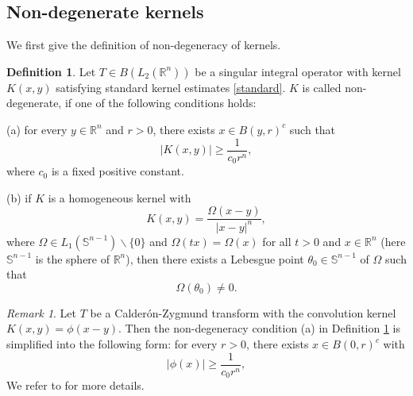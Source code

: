 \documentclass[oneside,english,a4wide]{amsart}
\numberwithin{equation}{section}
\numberwithin{figure}{section}
\theoremstyle{plain}
\theoremstyle{plain}
\theoremstyle{definition}
\theoremstyle{plain}
\theoremstyle{remark}
\theoremstyle{definition}
\newtheorem{definition}[thm]{Definition}
\theoremstyle{remark}
\newtheorem{remark}[thm]{Remark}
\theoremstyle{definition}
\newcommand{\8}{\infty}
\begin{document}
\subsection{Non-degenerate kernels}
We first give the definition of non-degeneracy of kernels.
\begin{definition}\label{nondege}
	Let $T\in B(L_2(\mathbb{R}^n))$ be a singular integral operator with kernel $K(x,y)$ satisfying standard kernel estimates \eqref{standard}. $K$ is called non-degenerate, if one of the following conditions holds:
	
	(a) for every $y\in \mathbb{R}^n$ and $r>0$, there exists $x\in B(y,r)^c$ such that
	\begin{equation}\label{nondege1}
		|K(x,y)|\ge \frac{1}{c_0r^n},
	\end{equation}
	where $c_0$ is a fixed positive constant.
	
	(b) if $K$ is a homogeneous kernel with
	\begin{equation}\label{nondege2}
		K(x,y)=\frac{\Omega(x-y)}{|x-y|^n},
	\end{equation}
	where $\Omega\in L_1(\mathbb{S}^{n-1})\backslash\{0\}$ and $\Omega(tx)=\Omega(x)$ for all $t>0$ and $x\in \mathbb{R}^n$ (here $\mathbb{S}^{n-1}$ is the sphere of $\mathbb{R}^n$), then there exists a Lebesgue point $\theta_0\in \mathbb{S}^{n-1}$ of $\Omega$ such that
	\begin{equation*}
		\Omega(\theta_0)\neq 0.
	\end{equation*}
	
\end{definition}	

\begin{remark}
	Let $T$ be a Calder\'{o}n-Zygmund transform with the convolution kernel $K(x,y)=\phi(x-y)$. Then the non-degeneracy condition (a) in Definition \ref{nondege} is simplified into the following form: for every $r>0$, there exists $x\in B(0,r)^c$ with
	\begin{equation*}
		|\phi(x)|\ge \frac{1}{c_0r^n},
	\end{equation*}
	We refer to \cite{TH3} for more details.
\end{remark}
\end{document}
